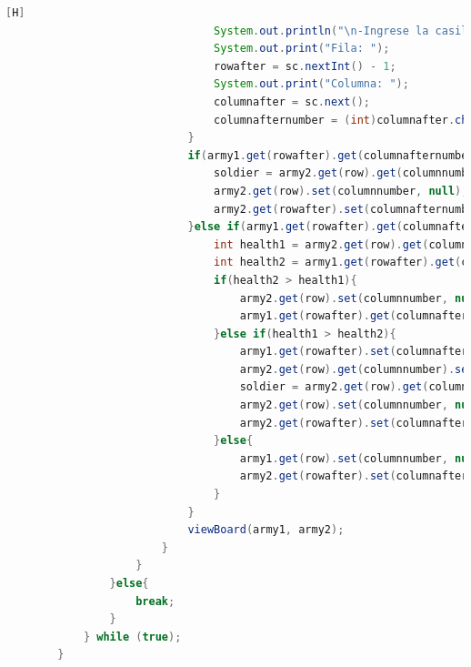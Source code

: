 \documentclass{article}
\begin{document}
\begin{lstlisting}[language=java,caption={Las lineas de codigos del metodo creado:}][H]
								System.out.println("\n-Ingrese la casilla a mover");    
								System.out.print("Fila: ");
								rowafter = sc.nextInt() - 1;
								System.out.print("Columna: ");
								columnafter = sc.next();
								columnafternumber = (int)columnafter.charAt(0) - 65; 
							}
							if(army1.get(rowafter).get(columnafternumber) == null && army2.get(rowafter).get(columnafternumber) == null){
								soldier = army2.get(row).get(columnnumber);
								army2.get(row).set(columnnumber, null);
								army2.get(rowafter).set(columnafternumber,soldier);
							}else if(army1.get(rowafter).get(columnafternumber) != null){
								int health1 = army2.get(row).get(columnnumber).getLifeActual();
								int health2 = army1.get(rowafter).get(columnafternumber).getLifeActual();
								if(health2 > health1){
									army2.get(row).set(columnnumber, null);
									army1.get(rowafter).get(columnafternumber).setLifeActual(health2 - health1);
								}else if(health1 > health2){
									army1.get(rowafter).set(columnafternumber, null); //ELIMINAMOS AL SOLDADO DEL OTRO BANDO DE ESA CASILLA
									army2.get(row).get(columnnumber).setLifeActual(health1 - health2); //CAMBIAMOS LA VIDA ANTES DE MANDARLO CON EL OBJETO SOLDADO QUE HICIMOS
									soldier = army2.get(row).get(columnnumber);
									army2.get(row).set(columnnumber, null); //ELIMINAMOS AL SOLDADO DE LA CASILLA DE DONDE ESTABA
									army2.get(rowafter).set(columnafternumber, soldier); //PONEMOS AL SOLDADO EN LA NUEVA CASILLA
								}else{
									army1.get(row).set(columnnumber, null);
									army2.get(rowafter).set(columnafternumber, null);
								}
							}
							viewBoard(army1, army2);
						}
					}
				}else{
					break;   
				}
			} while (true);
		}
	\end{lstlisting}
\end{document}
